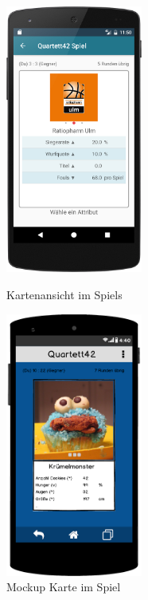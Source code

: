 \begin{figure}[h]
    \centering
    \begin{minipage}{0.49\textwidth}
        \centering
        \includegraphics[width=0.4\textwidth]{img/screenshots/device_select_attr.png}
		\caption{Kartenansicht im Spiels}
		\label{figure:implementierungspiel1}
    \end{minipage}
    \begin{minipage}{0.49\textwidth}
        \centering
        \includegraphics[width=0.4\textwidth]{img/mockups/spiel_attributauswahl.png}
        \caption{Mockup Karte im Spiel}
    \end{minipage}
\end{figure}



